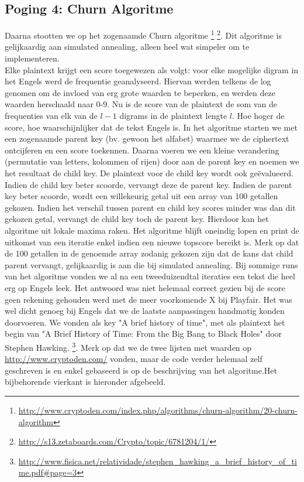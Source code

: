 \subsection{Poging 4: Churn Algoritme}
Daarna stootten we op het zogenaamde Churn algoritme \footnote{\url{http://www.cryptoden.com/index.php/algorithms/churn-algorithm/20-churn-algorithm}} \footnote{\url{http://s13.zetaboards.com/Crypto/topic/6781204/1/}}. Dit algoritme is gelijkaardig aan simulated annealing, alleen heel wat simpeler om te implementeren. \\ 
Elke plaintext krijgt een score toegewezen als volgt: voor elke mogelijke digram in het Engels werd de frequentie geanalyseerd. Hiervan werden telkens de log genomen om de invloed van erg grote waarden te beperken, en werden deze waarden herschaald naar 0-9. Nu is de score van de plaintext de som van de frequenties van elk van de $l-1$ digrams in de plaintext lengte $l$. Hoe hoger de score, hoe waarschijnlijker dat de tekst Engels is. In het algoritme starten we met een zogenaamde parent key (bv. gewoon het alfabet) waarmee we de ciphertext ontcijferen en een score toekennen. Daarna voeren we een kleine verandering (permutatie van letters, kolommen of rijen) door aan de parent key en noemen we het resultaat de child key. De plaintext voor de child key wordt ook ge\"evalueerd. Indien de child key beter scoorde, vervangt deze de parent key. Indien de parent key beter scoorde, wordt een willekeurig getal uit een array van 100 getallen gekozen. Indien het verschil tussen parent en child key scores minder was dan dit gekozen getal, vervangt de child key toch de parent key. Hierdoor kan het algoritme uit lokale maxima raken. Het algoritme blijft oneindig lopen en print de uitkomst van een iteratie enkel indien een nieuwe topscore bereikt is. Merk op dat de 100 getallen in de genoemde array zodanig gekozen zijn dat de kans dat child parent vervangt, gelijkaardig is aan die bij simulated annealing. Bij sommige runs van het algoritme vonden we al na een tweeduizendtal iteraties een tekst die heel erg op Engels leek. Het antwoord was niet helemaal correct gezien bij de score geen rekening gehouden werd met de meer voorkomende X bij Playfair. Het was wel dicht genoeg bij Engels dat we de laatste aanpassingen handmatig konden doorvoeren. We vonden als key "A brief history of time", met als plaintext het begin van "A Brief History of Time: From the Big Bang to Black Holes" door Stephen Hawking. \footnote{\url{http://www.fisica.net/relatividade/stephen_hawking_a_brief_history_of_time.pdf\#page=3}}. Merk op dat we de twee lijsten met waarden op \url{http://www.cryptoden.com/} vonden, maar de code verder helemaal zelf geschreven is en enkel gebaseerd is op de beschrijving van het algoritme.Het bijbehorende vierkant is hieronder afgebeeld.   \\
